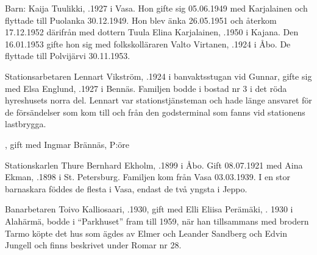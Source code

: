 Barn: Kaija Tuulikki, .1927 i Vasa. Hon gifte sig 05.06.1949 med Karjalainen och flyttade till Puolanka 30.12.1949. Hon blev änka 26.05.1951 och återkom 17.12.1952 därifrån med dottern Tuula Elina Karjalainen, .1950 i Kajana. Den 16.01.1953 gifte hon sig med folkskolläraren Valto Virtanen, .1924 i Åbo. De flyttade till Polvijärvi 30.11.1953.


Stationsarbetaren Lennart Vikström, .1924 i banvaktsstugan vid Gunnar, gifte sig med Elsa Englund, .1927 i Bennäs. Familjen bodde i bostad nr 3 i det röda hyreshusets norra del. Lennart var stationstjänsteman och hade länge ansvaret för de försändelser som kom till och från den godsterminal som fanns vid stationens lastbrygga.
\begin{jhchildren}
  \item {}, gift med Ingmar Brännäs, P:öre
  \item {}
\end{jhchildren}


Stationskarlen Thure Bernhard Ekholm, .1899 i Åbo. Gift 08.07.1921 med Aina Ekman, .1898 i St. Petersburg. Familjen kom från Vasa 03.03.1939. I en stor barnaskara föddes de flesta i Vasa, endast de två yngsta i Jeppo.
\begin{jhchildren}
  \item {}
  \item {}
  \item {}
  \item {}
  \item {}
  \item {}
  \item {}
  \item {}
  \item {}
  \item {}
  \item {}
\end{jhchildren}

Banarbetaren Toivo Kalliosaari, .1930, gift med Elli Eliisa Perämäki, . 1930 i Alahärmä, bodde i ``Parkhuset'' fram till 1959, när han tillsammans med brodern Tarmo köpte det hus som ägdes av Elmer och Leander Sandberg och Edvin Jungell och finns beskrivet under Romar nr 28.

